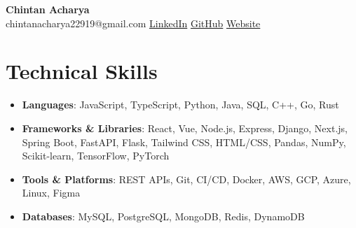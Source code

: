 \documentclass[a4paper,10pt]{article}
\begin{document}
\pagestyle{empty}

\begin{center}
    {\LARGE\bfseries Chintan Acharya}\\[6pt]
    {\small chintanacharya22919@gmail.com \textbar{}  \textbar{} \href{https://www.linkedin.com/in/chintan-acharya-b5757a192/}{LinkedIn} \textbar{} \href{https://github.com/chintan-27}{GitHub} \textbar{} \href{https://thecka.tech/}{Website}}
\end{center}

\vspace{-8pt}

\section*{Technical Skills}
\vspace{-3pt}
\begin{itemize}
   \item \textbf{Languages}: JavaScript, TypeScript, Python, Java, SQL, C++, Go, Rust
\item \textbf{Frameworks & Libraries}: React, Vue, Node.js, Express, Django, Next.js, Spring Boot, FastAPI, Flask, Tailwind CSS, HTML/CSS, Pandas, NumPy, Scikit-learn, TensorFlow, PyTorch
\item \textbf{Tools & Platforms}: REST APIs, Git, CI/CD, Docker, AWS, GCP, Azure, Linux, Figma
\item \textbf{Databases}: MySQL, PostgreSQL, MongoDB, Redis, DynamoDB
\end{itemize}

\vspace{-8pt}
\end{document}
